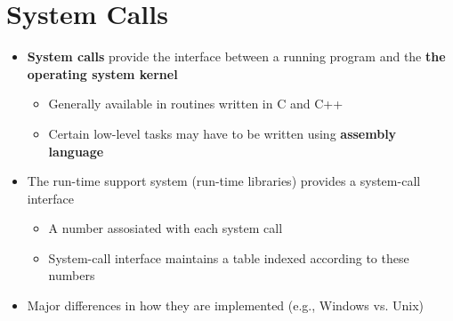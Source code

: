 \documentclass{article}
\begin{document}
\section{System Calls}
\begin{itemize}
    \item \textbf{\color{blue!45!white}System calls} provide the interface between a running program and the \textbf{\color{blue!45!white} the operating system kernel}
        \begin{itemize}[-]
            \item Generally available in routines written in C and C++
            \item Certain low-level tasks may have to be written using \textbf{\color{blue!45!white}assembly language} 
        \end{itemize}

    \item The run-time support system (run-time libraries) provides a system-call interface
        \begin{itemize}[-]
            \item A number assosiated with each system call
            \item System-call interface maintains a table indexed according to these numbers
        \end{itemize}
    \item Major differences in how they are implemented (e.g., Windows vs. Unix)
\end{itemize}
\end{document}
